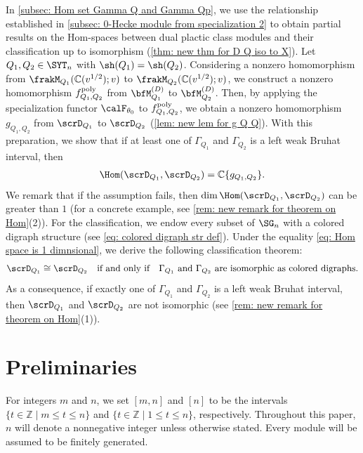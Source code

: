 \documentclass[12pt, reqno]{amsart}
\theoremstyle{plain}
\theoremstyle{definition}
\numberwithin{equation}{section}
\numberwithin{figure}{section}
\numberwithin{table}{section}
\def\C{\mathbb C}
\begin{document}
In \cref{subsec: Hom set Gamma Q and Gamma Qp}, we use the relationship established in \cref{subsec: 0-Hecke module from specialization 2} to obtain partial results on the Hom-spaces between dual plactic class modules and their classification up to isomorphism (\cref{thm: new thm for D Q iso to X}).
Let $Q_1,Q_2 \in \SYT_n$ with $\sh(Q_1) = \sh(Q_2)$.
Considering a nonzero homomorphism from $\frakM_{Q_1}(\C(v^{1/2});v)$ to $\frakM_{Q_2}(\C(v^{1/2});v)$, 
we construct a nonzero homomorphism $f^{\rm poly}_{Q_1, Q_2}$ from $\bfM^{(D)}_{Q_1}$ to $\bfM^{(D)}_{Q_2}$.
Then, by applying the specialization functor $\calF_{\theta_0}$ to $f^{\rm poly}_{Q_1, Q_2}$, we obtain a nonzero homomorphism $g_{Q_1, Q_2}$ from $\scrD_{Q_1}$ to $\scrD_{Q_2}$ (\cref{lem: new lem for g Q Q}).
With this preparation, we show that if at least one of $\Gamma_{Q_1}$ and $\Gamma_{Q_2}$ is a left weak Bruhat interval, then
\begin{align}\label{eq: Hom space is 1 dimnsional}
\Hom(\scrD_{Q_1}, \scrD_{Q_2}) = \C\{g_{Q_1, Q_2}\}.
\end{align}
We remark that if the assumption fails, then
  $ \dim\Hom(\scrD_{Q_1}, \scrD_{Q_2})$ can be greater than $1$
(for a concrete example, see \cref{rem: new remark for theorem on Hom}(2)).
For the classification, we endow every subset of $\SG_n$ with a colored digraph structure (see \cref{eq: colored digraph str def}).
Under the equality \cref{eq: Hom space is 1 dimnsional}, we derive the following classification theorem: 
\begin{align}\label{eq: classification in intro}
\scrD_{Q_1} \cong \scrD_{Q_2} \quad\text{if and only if}\quad \text{$\Gamma_{Q_1}$ and  $\Gamma_{Q_2}$ are isomorphic as colored digraphs.}
\end{align}
As a consequence, if exactly one of $\Gamma_{Q_1}$ and $\Gamma_{Q_2}$ is a left weak Bruhat interval, then $\scrD_{Q_1}$ and $\scrD_{Q_2}$ are not isomorphic (see \cref{rem: new remark for theorem on Hom}(1)).






\section{Preliminaries}
\label{sec: Prelim}


For integers $m$ and $n$, we set $[m,n]$ and $[n]$ to be the intervals $\{t\in \mathbb Z \mid m\le t \le n\}$ and $\{t\in \mathbb Z \mid 1\le t \le n\}$, respectively.
Throughout this paper, $n$ will denote a nonnegative integer unless otherwise stated. 
Every module will be assumed to be finitely generated.
\end{document}

